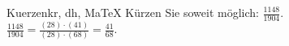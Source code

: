 \begin{MAufgabe}{Kuerzen}{kr, dh, MaTeX}
K\"urzen Sie soweit m\"oglich: $\frac{1148}{1904}$.\\ 
\ifLsg\MLoesung
\quad $\frac{1148}{1904}=\frac{(28)\cdot(41)}{(28)\cdot(68)}=\frac{41}{68}$.\else\relax\fi
 \end{MAufgabe}